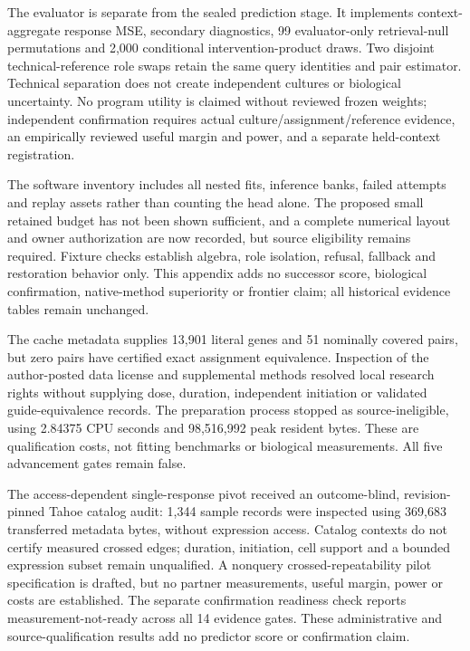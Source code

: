 The evaluator is separate from the sealed prediction stage. It implements context-aggregate response MSE, secondary diagnostics, 99 evaluator-only retrieval-null permutations and 2,000 conditional intervention-product draws. Two disjoint technical-reference role swaps retain the same query identities and pair estimator. Technical separation does not create independent cultures or biological uncertainty. No program utility is claimed without reviewed frozen weights; independent confirmation requires actual culture/assignment/reference evidence, an empirically reviewed useful margin and power, and a separate held-context registration.

The software inventory includes all nested fits, inference banks, failed attempts and replay assets rather than counting the head alone. The proposed small retained budget has not been shown sufficient, and a complete numerical layout and owner authorization are now recorded, but source eligibility remains required. Fixture checks establish algebra, role isolation, refusal, fallback and restoration behavior only. This appendix adds no successor score, biological confirmation, native-method superiority or frontier claim; all historical evidence tables remain unchanged.

The cache metadata supplies 13,901 literal genes and 51 nominally covered pairs, but zero pairs have certified exact assignment equivalence. Inspection of the author-posted data license and supplemental methods resolved local research rights without supplying dose, duration, independent initiation or validated guide-equivalence records. The preparation process stopped as source-ineligible, using 2.84375 CPU seconds and 98,516,992 peak resident bytes. These are qualification costs, not fitting benchmarks or biological measurements. All five advancement gates remain false.

The access-dependent single-response pivot received an outcome-blind, revision-pinned Tahoe catalog audit: 1,344 sample records were inspected using 369,683 transferred metadata bytes, without expression access. Catalog contexts do not certify measured crossed edges; duration, initiation, cell support and a bounded expression subset remain unqualified. A nonquery crossed-repeatability pilot specification is drafted, but no partner measurements, useful margin, power or costs are established. The separate confirmation readiness check reports measurement-not-ready across all 14 evidence gates. These administrative and source-qualification results add no predictor score or confirmation claim.
